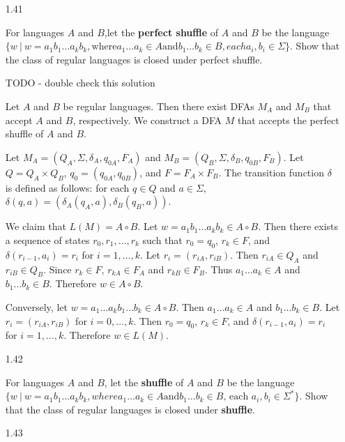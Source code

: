 \begin{enumerate}

      \item [1.41]

            For languages $A$ and $B$,let the \textbf{perfect shuffle} of $A$ and $B$ be the language $\{w~|~ w = a_1b_1\ldots a_kb_k , \text{where} a_1\ldots a_k \in A \text{and} b_1 \ldots b_k \in B, each a_i,b_i \in \Sigma\}$. Show that the class of regular languages is closed under perfect shuffle.

            TODO - double check this solution

            Let $A$ and $B$ be regular languages. Then there exist DFAs $M_A$ and $M_B$ that accept $A$ and $B$, respectively. We construct a DFA $M$ that accepts the perfect shuffle of $A$ and $B$.

            Let $M_A = (Q_A,\Sigma,\delta_A,q_{0A},F_A)$ and $M_B = (Q_B,\Sigma,\delta_B,q_{0B},F_B)$. Let $Q = Q_A \times Q_B$, $q_0 = (q_{0A},q_{0B})$, and $F = F_A \times F_B$. The transition function $\delta$ is defined as follows: for each $q \in Q$ and $a \in \Sigma$, $\delta(q,a) = (\delta_A(q_A,a),\delta_B(q_B,a))$.

            We claim that $L(M) = A \circ B$. Let $w = a_1b_1\ldots a_kb_k \in A \circ B$. Then there exists a sequence of states $r_0,r_1,\ldots,r_k$ such that $r_0 = q_0$, $r_k \in F$, and $\delta(r_{i-1},a_i) = r_i$ for $i = 1,\ldots,k$. Let $r_i = (r_{iA},r_{iB})$. Then $r_{iA} \in Q_A$ and $r_{iB} \in Q_B$. Since $r_k \in F$, $r_{kA} \in F_A$ and $r_{kB} \in F_B$. Thus $a_1\ldots a_k \in A$ and $b_1\ldots b_k \in B$. Therefore $w \in A \circ B$.

            Conversely, let $w = a_1\ldots a_kb_1\ldots b_k \in A \circ B$. Then $a_1\ldots a_k \in A$ and $b_1\ldots b_k \in B$. Let $r_i = (r_{iA},r_{iB})$ for $i = 0,\ldots,k$. Then $r_0 = q_0$, $r_k \in F$, and $\delta(r_{i-1},a_i) = r_i$ for $i = 1,\ldots,k$. Therefore $w \in L(M)$.


      \item [1.42]

            For languages $A$ and $B$, let the \textbf{shuffle} of $A$ and $B$ be the language $\{w~|~ w = a_1b_1\ldots a_kb_k, where a_1 \ldots a_k \in A \text{and} b_1 \ldots b_k \in B\text{, each }a_i,b_i \in \Sigma^\ast\}$. Show that the class of regular languages is closed under \textbf{shuffle}.

      \item [1.43]


\end{enumerate}
